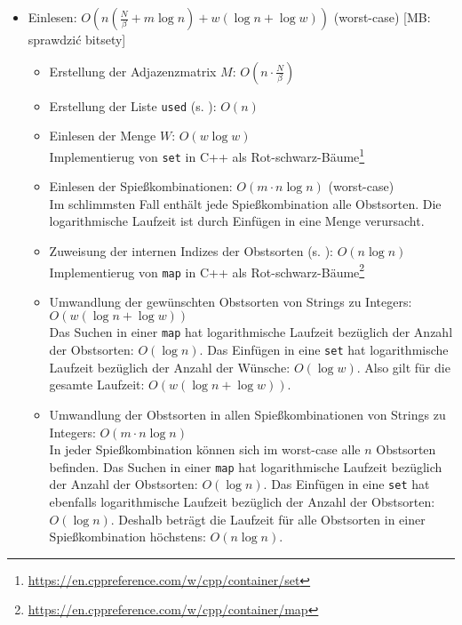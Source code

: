 \documentclass[a4paper,10pt,ngerman]{scrartcl}
\newcommand{\mb}[1]{{\color{red}[MB: #1]}}
\newcommand{\ttt}[1]{\texttt{#1}}
\begin{document}
\begin{itemize}
  \item Einlesen: $O(n (\frac{N}{\beta} + m \log n) + w (\log n + \log w))$ (worst-case) \mb{sprawdzić bitsety}
  \begin{itemize}
    \item Erstellung der Adjazenzmatrix $M$: $O(n \cdot \frac{N}{\beta})$

    \item Erstellung der Liste \ttt{used} (s. ): $O(n)$

    \item Einlesen der Menge $W$: $O(w \log w)$\\%
     Implementierug von \ttt{set} in C++ als Rot-schwarz-Bäume\footnote{\href{https://en.cppreference.com/w/cpp/container/set}{https://en.cppreference.com/w/cpp/container/set}}

    \item Einlesen der Spießkombinationen: $O(m \cdot n \log n)$ (worst-case)\\
    Im schlimmsten Fall enthält jede Spießkombination alle Obstsorten.
    Die logarithmische Laufzeit ist durch Einfügen in eine Menge verursacht.

    \item Zuweisung der internen Indizes der Obstsorten (s. ): $O(n \log n)$\\
     Implementierug von \ttt{map} in C++ als Rot-schwarz-Bäume\footnote{\href{https://en.cppreference.com/w/cpp/container/map}{https://en.cppreference.com/w/cpp/container/map}}

    \item Umwandlung der gewünschten Obstsorten von Strings zu Integers: $O(w (\log n + \log w))$\\%
    Das Suchen in einer \ttt{map} hat logarithmische Laufzeit bezüglich der Anzahl
    der Obstsorten: $O(\log n)$.
    Das Einfügen in eine \ttt{set} hat logarithmische Laufzeit bezüglich der Anzahl
    der Wünsche: $O(\log w)$. Also gilt für die gesamte Laufzeit: $O(w (\log n + \log w))$. 

    \item Umwandlung der Obstsorten in allen Spießkombinationen von Strings zu Integers:
    $O(m \cdot n \log n)$\\
    In jeder Spießkombination können sich im worst-case alle $n$ Obstsorten befinden.
    Das Suchen in einer \ttt{map} hat logarithmische Laufzeit bezüglich der Anzahl
    der Obstsorten: $O(\log n)$.
    Das Einfügen in eine \ttt{set} hat ebenfalls logarithmische Laufzeit bezüglich der Anzahl
    der Obstsorten: $O(\log n)$. 
    Deshalb beträgt die Laufzeit für alle Obstsorten in einer Spießkombination höchstens: $O(n \log n)$. 


\end{itemize}
\end{itemize}
\end{document}
